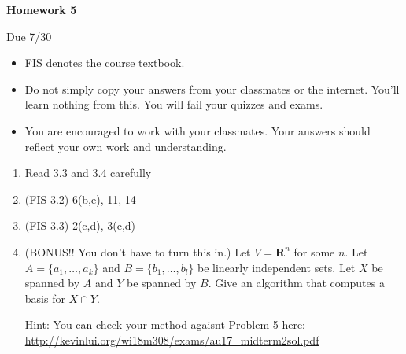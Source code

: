 \documentclass{article}
\begin{document}
\begin{center}
    {\bf Homework 5}
    
    Due 7/30
\end{center}

\begin{itemize}
    \item 
        FIS denotes the course textbook.
    \item
        Do not simply copy your answers from your classmates or the internet.
        You'll learn nothing from this. You will fail your quizzes and exams.
    \item
        You are encouraged to work with your classmates. Your answers
        should reflect your own work and understanding.
\end{itemize}

\begin{enumerate}
	\item
		Read 3.3 and 3.4 carefully
	\item
		(FIS 3.2) 6(b,e), 11, 14
	\item
		(FIS 3.3) 2(c,d), 3(c,d)
    \item
		(BONUS!! You don't have to turn this in.) Let $V=\mathbf{R}^n$ for some
		$n$. Let $A=\{a_1,\ldots,a_k\}$ and $B=\{b_1,\ldots,b_l\}$ be linearly
		independent sets. Let $X$ be spanned by $A$ and $Y$ be spanned by $B$. Give an
		algorithm that computes a basis for $X\cap Y$.

		Hint: You can check your method agaisnt Problem 5 here:
		\url{http://kevinlui.org/wi18m308/exams/au17_midterm2sol.pdf}
\end{enumerate}
    
\end{document}
